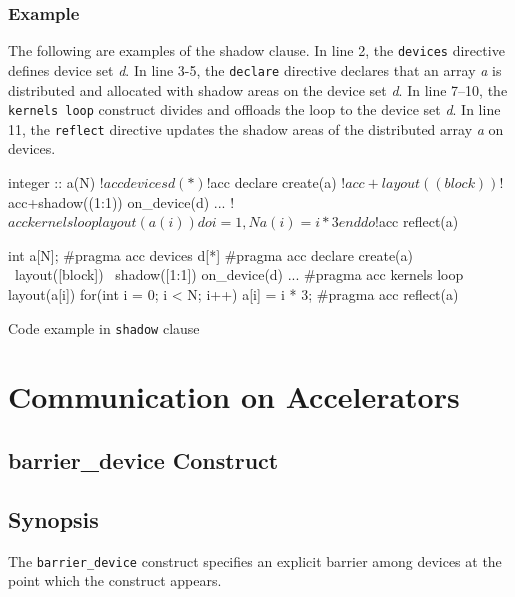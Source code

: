 \subsubsection*{Example}
The following are examples of the shadow clause.
In line 2, the {\tt devices} directive defines device set {\it d}.
In line 3-5, the {\tt declare} directive declares that an array {\it a} is distributed and allocated with shadow areas on the device set {\it d}.
In line 7--10, the {\tt kernels loop} construct divides and offloads the loop to the device set {\it d}.
In line 11, the {\tt reflect} directive updates the shadow areas of the distributed array {\it a} on devices.
%
\begin{myfigure}
\begin{minipage}{0.47\hsize}
\begin{center}
\begin{XACCFexampleL}
integer :: a(N)
!$acc devices d(*)
!$acc declare create(a)
!$acc+layout((block))
!$acc+shadow((1:1)) on_device(d)
...
!$acc kernels loop layout(a(i))
do i = 1, N
  a(i) = i * 3
end do
!$acc reflect(a)
\end{XACCFexampleL}
\end{center}
\end{minipage}
%
\begin{minipage}{0.48\hsize}
\begin{center}
\begin{XACCCexampleR}
int a[N];
#pragma acc devices d[*]
#pragma acc declare create(a) \
        layout([block]) \
        shadow([1:1]) on_device(d)
...
#pragma acc kernels loop layout(a[i])
for(int i = 0; i < N; i++){
  a[i] = i * 3;
}
#pragma acc reflect(a)
\end{XACCCexampleR}
\end{center}
\end{minipage}
\caption{Code example in {\XACC} {\tt shadow} clause}\label{code:shadow_clause}
\end{myfigure}


\section{Communication on Accelerators}
\subsection{barrier\_device Construct}
\subsection*{Synopsis}
The {\tt barrier\_device} construct specifies an explicit barrier among devices at the point which the construct appears.

